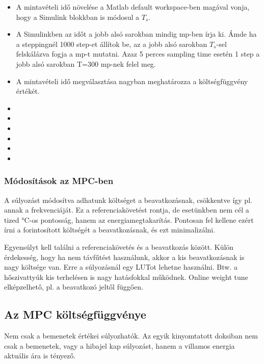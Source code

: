 \begin{itemize}[noitemsep,topsep=-8pt,parsep=0pt,partopsep=0pt]
	\item A mintavételi idő növelése a Matlab default workspace-ben magával vonja, hogy a Simulink blokkban is módosul a $T_s$. 
	\item A Simulinkben az időt a jobb alsó sarokban mindig mp-ben írja ki. Ámde ha a steppingnél 1000 step-et állítok be, az a jobb alsó sarokban $T_s$-sel felskálázva fogja a mp-t mutatni. Azaz 5 perces sampling time esetén 1 step a jobb alsó sarokban T=300 mp-nek felel meg.
	\item A mintavételi idő megválasztása nagyban meghatározza a költségfüggvény értékét.
	\item
	\item
	\item
	\item
	\item
	\item	
\end{itemize}



\subsubsection{Módosítások az MPC-ben}

A súlyozást módosítva adhatunk költséget a beavatkozásnak, csökkentve így pl. annak a frekvenciáját. Ez a referenciakövetést rontja, de esetünkben nem cél a tized \si{\celsius}-os pontosság, hanem az energiamegtakarítás.
Pontosan fel kellene ezért írni a forintosított költségét a beavatkozásnak, és ezt minimalizálni.

Egyensúlyt kell találni a referenciakövetés és a beavatkozás között. Külön érdekesség, hogy ha nem távfűtést használunk, akkor a kis beavatkozásnak is nagy költsége van. Erre a súlyozásnál egy LUTot lehetne használni. Btw. a hőszivattyúk kis terhelésen is nagy hatásfokkal működnek. Online weight tune elképzelhető, pl. a beavatkozó jeltől függően.

\subsection{Az MPC költségfüggvénye}




Nem csak a bemenetek értékei súlyozhatók. Az egyik kinyomtatott doksiban nem csak a bemenetek, vagy a hibajel kap súlyozást, hanem a villamos energia aktuális ára is tényező.

